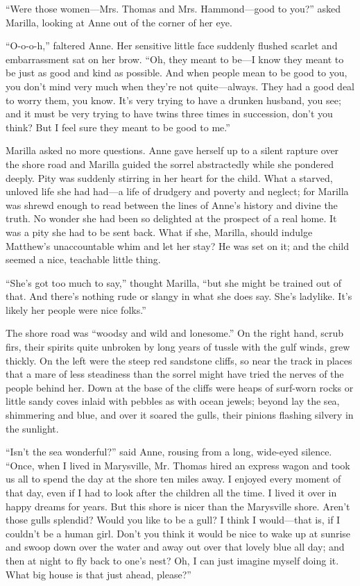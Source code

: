 \documentclass[a4paper]{article}
\begin{document}
``Were those women---Mrs. Thomas and Mrs. Hammond---good to you?'' asked Marilla, looking at Anne out of the corner of her eye.

``O-o-o-h,'' faltered Anne. Her sensitive little face suddenly flushed scarlet and embarrassment sat on her brow. ``Oh, they meant to be---I know they meant to be just as good and kind as possible. And when people mean to be good to you, you don't mind very much when they're not quite---always. They had a good deal to worry them, you know. It's very trying to have a drunken husband, you see; and it must be very trying to have twins three times in succession, don't you think? But I feel sure they meant to be good to me.''

Marilla asked no more questions. Anne gave herself up to a silent rapture over the shore road and Marilla guided the sorrel abstractedly while she pondered deeply. Pity was suddenly stirring in her heart for the child. What a starved, unloved life she had had---a life of drudgery and poverty and neglect; for Marilla was shrewd enough to read between the lines of Anne's history and divine the truth. No wonder she had been so delighted at the prospect of a real home. It was a pity she had to be sent back. What if she, Marilla, should indulge Matthew's unaccountable whim and let her stay? He was set on it; and the child seemed a nice, teachable little thing.

``She's got too much to say,'' thought Marilla, ``but she might be trained out of that. And there's nothing rude or slangy in what she does say. She's ladylike. It's likely her people were nice folks.''

The shore road was ``woodsy and wild and lonesome.'' On the right hand, scrub firs, their spirits quite unbroken by long years of tussle with the gulf winds, grew thickly. On the left were the steep red sandstone cliffs, so near the track in places that a mare of less steadiness than the sorrel might have tried the nerves of the people behind her. Down at the base of the cliffs were heaps of surf-worn rocks or little sandy coves inlaid with pebbles as with ocean jewels; beyond lay the sea, shimmering and blue, and over it soared the gulls, their pinions flashing silvery in the sunlight.

``Isn't the sea wonderful?'' said Anne, rousing from a long, wide-eyed silence. ``Once, when I lived in Marysville, Mr. Thomas hired an express wagon and took us all to spend the day at the shore ten miles away. I enjoyed every moment of that day, even if I had to look after the children all the time. I lived it over in happy dreams for years. But this shore is nicer than the Marysville shore. Aren't those gulls splendid? Would you like to be a gull? I think I would---that is, if I couldn't be a human girl. Don't you think it would be nice to wake up at sunrise and swoop down over the water and away out over that lovely blue all day; and then at night to fly back to one's nest? Oh, I can just imagine myself doing it. What big house is that just ahead, please?''
\end{document}
